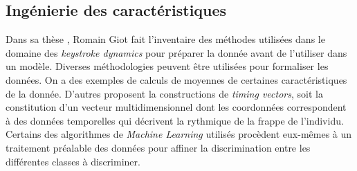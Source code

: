 \subsection{Ingénierie des caractéristiques}

Dans sa thèse \cite{giotThese}, Romain Giot fait l'inventaire des méthodes utilisées dans le domaine des \textit{keystroke dynamics} pour préparer la donnée avant de l'utiliser dans un modèle. Diverses méthodologies peuvent être utilisées pour formaliser les données. On a des exemples de calculs de moyennes de certaines caractéristiques de la donnée. D'autres proposent la constructions de \textit{timing vectors}\cite{killourhy2009}, soit la constitution d'un vecteur multidimensionnel dont les coordonnées correspondent à des données temporelles qui décrivent la rythmique de la frappe de l'individu.\\

Certains des algorithmes de \textit{Machine Learning} utilisés procèdent eux-mêmes à un traitement préalable des données pour affiner la discrimination entre les différentes classes à discriminer.

